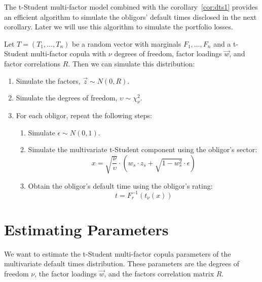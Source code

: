 \documentclass[11pt,fleqn]{book} %
\begin{document}
The t-Student multi-factor model combined with the corollary~\ref{cor:dts1} 
provides an efficient algorithm to simulate the obligors' default times 
disclosed in the next corollary. Later we will use this algorithm to simulate
the portfolio losses.

\begin{corollary}
	\label{cor:dts2}
	Let $T=(T_1, \dots, T_n)$ be a random vector with marginals 
	$F_1, \dots, F_n$ and a t-Student multi-factor copula with 
	$\nu$ degrees of freedom, factor loadings $\vec{w}$, and factor correlations 
	$R$. Then we can simulate this distribution:
	\begin{enumerate}
		\item Simulate the factors, $\vec{z} \sim N(0,R)$.
		\item Simulate the degrees of freedom, $\upsilon \sim \chi_{\nu}^2$.
		\item For each obligor, repeat the following steps:
		\begin{enumerate}
			\item Simulate $\epsilon \sim N(0,1)$.
			\item Simulate the multivariate t-Student component using the obligor's sector:
			\begin{displaymath}
				x = \sqrt{\frac{\nu}{\upsilon}} \cdot \left( w_s \cdot z_s + \sqrt{1-w_s^2} \cdot \epsilon \right)
			\end{displaymath}
			\item Obtain the obligor's default time using the obligor's rating:
			\begin{displaymath}
				t = F_r^{-1}\left(t_{\nu}(x)\right)
			\end{displaymath}
		\end{enumerate}
	\end{enumerate}
\end{corollary}


\chapter{Estimating Parameters}
\label{chap:estimation}

We want to estimate the t-Student multi-factor copula parameters of the 
multivariate default times distribution. These parameters are the degrees of 
freedom $\nu$, the factor loadings $\vec{w}$, and the factors correlation 
matrix $R$.
\end{document}
